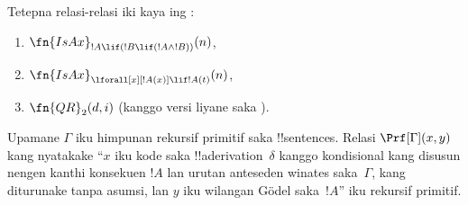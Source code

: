 \documentclass[../../../include/open-logic-section]{subfiles}
\begin{document}
\begin{prob}
Tetepna relasi-relasi iki kaya ing
:
\begin{enumerate}
\item $\fn{IsAx}_{!A \lif (!B \lif (!A \land !B))}(n)$,
\item $\fn{IsAx}_{\lforall[x][!A(x)] \lif !A(t)}(n)$,
\item $\fn{QR}_{2}(d, i)$ (kanggo versi liyane saka \QR).
\end{enumerate}
\end{prob}

\begin{prop}
Upamane $\Gamma$ iku himpunan rekursif primitif saka
!!{sentence}s. Relasi $\Prf[\Gamma](x, y)$ kang nyatakake
``$x$ iku kode saka !!a{derivation}~$\delta$ kanggo kondisional kang disusun nengen kanthi konsekuen $!A$
lan urutan anteseden winates saka~$\Gamma$, kang diturunake tanpa asumsi, lan $y$ iku wilangan G\"odel saka~$!A$''
iku rekursif primitif.
\end{prop}
\end{document}
